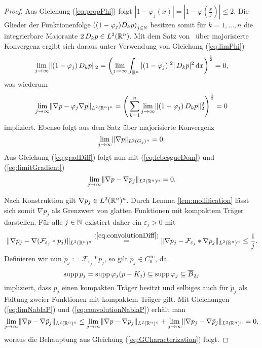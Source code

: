 \begin{proof}
  Aus Gleichung (\ref{eq:propPhi}) folgt $|1 - \varphi_j(x)| = |1 - \varphi(\tfrac{x}{j})| \leq 2$. 
  Die Glieder der Funktionenfolge $\left((1 - \varphi_j) D_k p\right)_{j \in \mathbb{N}}$ besitzen somit für $k = 1, \dots, n$ die integrierbare Majorante $2\, D_k p \in L^2(\mathbb{R}^n)$.
  Mit dem Satz von \lebesgue\ über majorisierte Konvergenz ergibt sich daraus unter Verwendung von Gleichung (\ref{eq:limPhi})
  $$
  \lim_{j \to \infty} \lVert (1 - \varphi_j) \,D_k p \rVert_2 
  = \left( \lim_{j \to \infty} \int_{\mathbb{R}^n} |(1 - \varphi_j)|^2 |\,D_k p|^2 \, {\operatorname{d}\!{x}} \right)^{\frac{1}{2}}
  = 0,
  $$
  was wiederum
  \begin{equation}
    \label{eq:lebesgueDom}
  \lim_{j \to \infty} \lVert \nabla p - \varphi_j \nabla p \rVert_{L^2(\mathbb{R}^n)^n}
  = \left(\, \sum_{k = 1}^n \lim_{j \to \infty} \lVert (1 - \varphi_j)\, D_k p \rVert_2^2  \right)^\frac{1}{2} = 0
  \end{equation}
  impliziert.
  Ebenso folgt aus dem Satz über majorisierte Konvergenz 
  \begin{equation}
    \label{eq:limitGradient}
  \lim_{j \to \infty} \lVert \nabla p \rVert_{L^2(G_j)^n}
  = 0.
  \end{equation}
  Aus Gleichung (\ref{eq:gradDiff}) folgt nun mit (\ref{eq:lebesgueDom}) und (\ref{eq:limitGradient})
  \begin{equation}
    \label{eq:limNablaP}
    \lim_{j \to \infty} \lVert \nabla p - \nabla p_j \rVert_{L^2(\mathbb{R}^n)^n} = 0.
  \end{equation}

  Nach Konstruktion gilt $\nabla p_j \in L^2(\mathbb{R}^n)^n$.
  Durch Lemma \ref{lem:mollification} lässt sich somit $\nabla p_j$ als Grenzwert von glatten Funktionen mit kompaktem Träger darstellen. Für alle $j \in \mathbb{N}$ existiert daher ein $\varepsilon_j > 0$ mit
  \begin{equation}
    \label{eq:convolutionNablaP}
  \lVert \nabla p_j - \nabla (\mathcal{F}_{\varepsilon_j} \ast p_j) \rVert_{L^2(\mathbb{R}^n)^n}
  \overset{(\ref{eq:convolutionDiff})}{=} \lVert \nabla p_j - \mathcal{F}_{\varepsilon_j} \ast \nabla p_j \rVert_{L^2(\mathbb{R}^n)^n}
  \leq \frac{1}{j}.
  \end{equation}
  Definieren wir nun $\tilde p_j := \mathcal{F}_{\varepsilon_j} \ast p_j$, so gilt $\tilde p_j \in C_0^\infty$, da 
  $$
  \operatorname{supp} p_j = \operatorname{supp} \varphi_j(p - K_j) 
  \subseteq \operatorname{supp} \varphi_j
  \subseteq \overline B_{2j}
  $$
  impliziert, dass $p_j$ einen kompakten Träger besitzt und selbiges auch für $\tilde p_j$ als Faltung zweier Funktionen mit kompaktem Träger gilt.
  Mit Gleichungen (\ref{eq:limNablaP}) und (\ref{eq:convolutionNablaP}) erhält man
  $$
  \lim_{j \to \infty} \lVert \nabla p - \nabla \tilde p_j \rVert_{L^2(\mathbb{R}^n)^n}
  \leq 
  \lim_{j \to \infty} \lVert \nabla p - \nabla p_j \rVert_{L^2(\mathbb{R}^n)^n} + \lim_{j \to \infty} \lVert \nabla p_j - \nabla \tilde p_j \rVert_{L^2(\mathbb{R}^n)^n}
  = 0, 
  $$
  woraus die Behauptung aus Gleichung (\ref{eq:GCharacterization}) folgt.


\end{proof}
